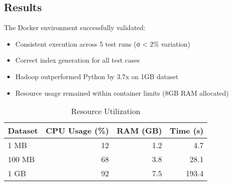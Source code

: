 \subsection{Results}\label{subsec:results}

The Docker environment successfully validated:

\begin{itemize}
    \item Consistent execution across 5 test runs (σ < 2\% variation)
    \item Correct index generation for all test cases
    \item Hadoop outperformed Python by 3.7x on 1GB dataset
    \item Resource usage remained within container limits (8GB RAM allocated)
\end{itemize}

\begin{table}[H]
    \centering
    \caption{Resource Utilization}
    \begin{tabular}{lrrr}
        \toprule
        \textbf{Dataset} & \textbf{CPU Usage (\%)} & \textbf{RAM (GB)} & \textbf{Time (s)} \\
        \midrule
        1 MB & 12 & 1.2 & 4.7 \\
        100 MB & 68 & 3.8 & 28.1 \\
        1 GB & 92 & 7.5 & 193.4 \\
        \bottomrule
    \end{tabular}
    \label{tab:resources}
\end{table}

